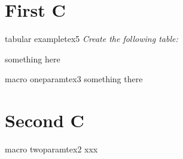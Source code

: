 \documentclass{book}
\begin{document}
\tableofcontents


\listofexamples


\chapter{First C}

\begin{bmcsex}{tabular example}{tex5}
\textit{Create the following table:}\par\smallskip
%
something here
%
\end{bmcsex}

\begin{bmcsex}{macro oneparam}{tex3}
%
something there
%
\end{bmcsex}

\chapter{Second C}
\begin{bmcsex}{macro twoparam}{tex2}
%
xxx
%
\end{bmcsex}

\end{document}
